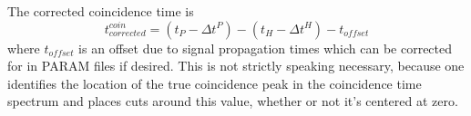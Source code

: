 The corrected coincidence time is
\begin{equation}
    t^{coin}_{corrected} = (t_P - \Delta t^P) - (t_H - \Delta t^H) - t_{offset}
\end{equation}
where $t_{offset}$ is an offset due to signal propagation times which can be
corrected for in PARAM files if desired.
This is not strictly speaking necessary, because one identifies the location of
the true coincidence peak in the coincidence time spectrum and places cuts
around this value, whether or not it's centered at zero.

